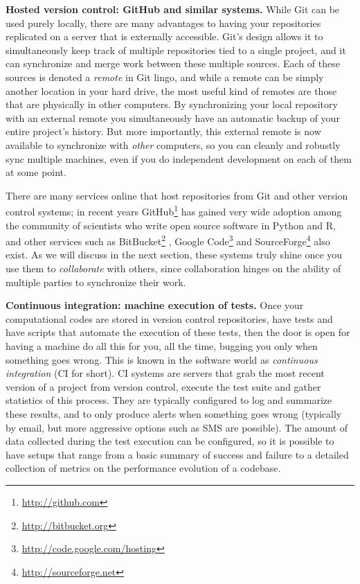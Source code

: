 \documentclass[ChapterTOCs,krantz2]{krantz} %
\newcommand{\blockpar}[1]{\vspace*{3mm} \noindent \textbf{#1}}
\begin{document}
\blockpar{Hosted version control: GitHub and similar systems.}  While Git can
be used purely locally, there are many advantages to having your repositories
replicated on a server that is externally accessible.  Git's design allows it
to simultaneously keep track of multiple repositories tied to a single project,
and it can synchronize and merge work between these multiple sources.  Each of
these sources is denoted a \emph{remote} in Git lingo, and while a remote can
be simply another location in your hard drive, the most useful kind of remotes
are those that are physically in other computers.  By synchronizing your local
repository with an external remote you simultaneously have an automatic backup
of your entire project's history.  But more importantly, this external remote
is now available to synchronize with \emph{other} computers, so you can cleanly
and robustly sync multiple machines, even if you do independent development on
each of them at some point.

There are many services online that host repositories from Git and other
version control systems; in recent years
GitHub\footnote{\url{http://github.com}} has gained very wide adoption among
the community of scientists who write open source software in Python and R, and
other services such as BitBucket\footnote{\url{http://bitbucket.org}} ,
Google Code\footnote{\url{http://code.google.com/hosting}} and
SourceForge\footnote{\url{http://sourceforge.net}} also exist.  As we will
discuss in the next section, these systems truly shine once you use them to
\emph{collaborate} with others, since collaboration hinges on the ability of
multiple parties to synchronize their work.

\blockpar{Continuous integration: machine execution of tests.} Once your
computational codes are stored in version control repositories, have tests and
have scripts that automate the execution of these tests, then the door is open
for having a machine do all this for you, all the time, bugging you only when
something goes wrong.  This is known in the software world as \emph{continuous
  integration} (CI for short). CI systems are servers that grab the most recent
version of a project from version control, execute the test suite and gather
statistics of this process.  They are typically configured to log and summarize
these results, and to only produce alerts when something goes wrong (typically
by email, but more aggressive options such as SMS are possible).  The amount of
data collected during the test execution can be configured, so it is possible
to have setups that range from a basic summary of success and failure to a
detailed collection of metrics on the performance evolution of a codebase.
\end{document}
